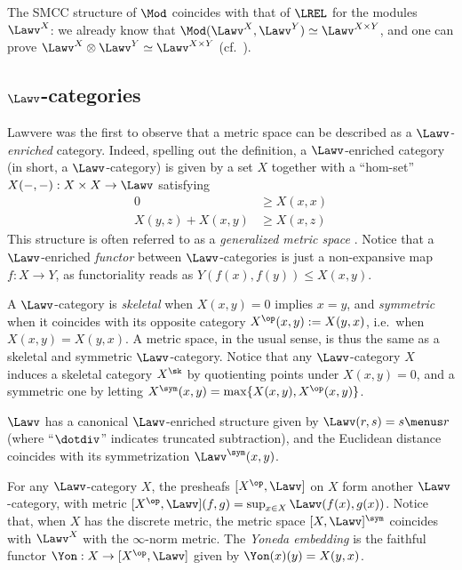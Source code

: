 \begin{remark}
The SMCC structure of $\Mod$ coincides with that of $\LREL$ for the modules $\Lawv^{X}$: we already know that $\Mod(\Lawv^{X},\Lawv^{Y})\simeq \Lawv^{X\times Y} $, and 
one can prove $\Lawv^{X}\otimes \Lawv^{Y}\simeq \Lawv^{X\times Y} $ (cf.~\cite{Russo2007}).%
\end{remark}



\subsection{$\Lawv$-categories}

Lawvere was the first to observe that a metric space can be described as a \emph{$\Lawv$-enriched} category. Indeed, spelling out the definition, a $\Lawv$-enriched category (in short, a $\Lawv$-category) is given by a set $X$ together with a ``hom-set'' $X(-,-):X\times X\to \Lawv$ satisfying 
\begin{align}
0  & \geq X(x,x) \tag{$\Lawv$-cat 1}\\
X(y,z)+X(x,y)&\geq  X(x,z) \tag{$\Lawv$-cat 2}
\end{align}
This structure is often referred to as a \emph{generalized metric space} \cite{Lawvere1973, Hofmann2014, Stubbe2014}. %
Notice that a $\Lawv$-enriched \emph{functor} between $\Lawv$-categories is just a non-expansive map $f:X\to Y$, as functoriality reads as $Y(f(x),f(y))\leq X(x,y)$.

A $\Lawv$-category is \emph{skeletal} \cite{Stubbe2014} when 
$X(x,y)=0$ implies $x=y$, and 
 \emph{symmetric} when it coincides with its opposite category $X^{\op}(x,y):=X(y,x)$, i.e.~when $X(x,y)=X(y,x)$. 
 A metric space, in the usual sense, is thus the same as a skeletal and symmetric $\Lawv$-category.
  Notice that any $\Lawv$-category $X$ induces a skeletal category $X^{\sk}$ by quotienting points under $X(x,y)=0$, and a symmetric one by letting $X^{\sym}(x,y)=\max\{X(x,y),X^{\op}(x,y)\}$.
 
 $\Lawv$ has a canonical $\Lawv$-enriched structure given by 
 $\Lawv(r,s)=s \menus r$ (where ``$\dotdiv$'' indicates truncated subtraction), and the Euclidean distance coincides with its symmetrization $\Lawv^{\sym}(x,y)$.
 
 
 
 
 

For any $\Lawv$-category $X$, the presheafs $[X^{\op},\Lawv]$ on $X$ form another $\Lawv$-category, with metric $[X^{\op},\Lawv](f,g)= \sup_{x\in X}\Lawv(f(x),g(x))$.
Notice that, when $X$ has the discrete metric, the metric space $[X,\Lawv]^{\sym}$ coincides with $\Lawv^{X}$ with the $\infty$-norm metric.
The \emph{Yoneda embedding} is the faithful functor $\Yon: X\to [X^{\op},\Lawv]$ given by $\Yon(x)(y)=X(y,x)$.




